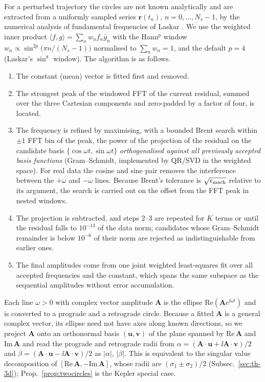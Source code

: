 For a perturbed trajectory the circles are not known analytically and are
extracted from a uniformly sampled series $\mathbf r(t_n)$, $n=0,\dots,N_s-1$,
by the numerical analysis of fundamental frequencies of Laskar
\cite{Laskar1990,Laskar1993}. We use the weighted inner product
$\langle f,g\rangle=\sum_nw_nf_n\bar g_n$ with the Hann$^p$ window
$w_n\propto\sin^{2p}\!\big(\pi n/(N_s-1)\big)$ normalised to $\sum_nw_n=1$, and
the default $p=4$ (Laskar's $\sin^8$ window). The algorithm is as follows.
\begin{enumerate}
\item The constant (mean) vector is fitted first and removed.
\item The strongest peak of the windowed FFT of the current residual, summed
over the three Cartesian components and zero-padded by a factor of four, is
located.
\item The frequency is refined by maximising, with a bounded Brent search within
$\pm1$ FFT bin of the peak, the power of the projection of the residual on the
candidate basis $\{\cos\omega t,\sin\omega t\}$ \emph{orthogonalised against all
previously accepted basis functions} (Gram--Schmidt, implemented by QR/SVD in
the weighted space). For real data the cosine and sine pair removes the
interference between the $+\omega$ and $-\omega$ lines. Because Brent's
tolerance is $\sqrt{\epsilon_{\rm mach}}$ relative to its argument,
the search is carried out on the offset from the FFT peak in nested windows.
\item The projection is subtracted, and steps 2--3 are repeated for $K$ terms
or until the residual falls to $10^{-13}$ of the data norm; candidates whose
Gram--Schmidt remainder is below $10^{-6}$ of their norm are rejected as
indistinguishable from earlier ones.
\item The final amplitudes come from one joint weighted least-squares fit over
all accepted frequencies and the constant, which spans the same subspace as the
sequential amplitudes without error accumulation.
\end{enumerate}
Each line $\omega>0$ with complex vector amplitude $\mathbf A$ is the ellipse
$\mathrm{Re}(\mathbf Ae^{\ii\omega t})$ and is converted to a prograde and a
retrograde circle. Because a fitted $\mathbf A$ is a general complex vector, its
ellipse need not have axes along known directions, so we project $\mathbf A$ onto
an orthonormal basis $(\mathbf u,\mathbf v)$ of the plane spanned by
$\mathrm{Re}\,\mathbf A$ and $\mathrm{Im}\,\mathbf A$ and read the prograde and
retrograde radii from $\alpha=(\mathbf A\!\cdot\!\mathbf u+\ii\mathbf A\!\cdot\!\mathbf v)/2$ and
$\beta=(\mathbf A\!\cdot\!\mathbf u-\ii\mathbf A\!\cdot\!\mathbf v)/2$ as $|\alpha|$, $|\beta|$. This is
equivalent to the singular value decomposition of
$[\mathrm{Re}\,\mathbf A,-\mathrm{Im}\,\mathbf A]$, whose radii are
$(\sigma_1\pm\sigma_2)/2$ (Subsec.~\ref{sec:th-3d}); Prop.~\ref{prop:twocircles}
is the Kepler special case.

